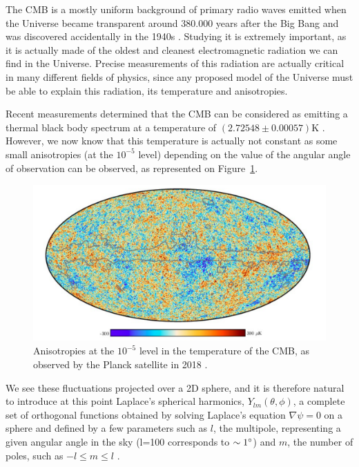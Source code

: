 \documentclass[a4paper, 10pt, openright]{report}
\begin{document}
The \ac{CMB} is a mostly uniform background of primary radio waves emitted when the Universe became transparent around 380.000 years after the Big Bang and was discovered accidentally in the 1940s \cite{CMBDiscovery}. Studying it is extremely important, as it is actually made of the oldest and cleanest electromagnetic radiation we can find in the Universe. Precise measurements of this radiation are actually critical in many different fields of physics, since any proposed model of the Universe must be able to explain this radiation, its temperature and anisotropies. 

Recent measurements determined that the \ac{CMB} can be considered as emitting a thermal black body spectrum at a temperature of $(2.72548\pm 0.00057)$K \cite{CMBTemperature}. However, we now know that this temperature is actually not constant as some small anisotropies (at the $10^{-5}$ level) depending on the value of the angular angle of observation can be observed, as represented on Figure~\ref{figure:PlanckTemperature}.

\begin{figure}[htbp]
\begin{center}
\includegraphics[width=14cm, height=6cm]{figs/PlanckTemperature.png}
\caption{Anisotropies at the $10^{-5}$ level in the temperature of the \ac{CMB}, as observed by the Planck satellite in 2018 \cite{PlanckTemperature}.}
\label{figure:PlanckTemperature}
\end{center}
\end{figure}


We see these fluctuations projected over a 2D sphere, and it is therefore natural to introduce at this point Laplace's spherical harmonics, $Y_{lm} (\theta, \phi)$, a complete set of orthogonal functions obtained by solving Laplace's equation $\nabla \psi = 0$ on a sphere and defined by a few parameters such as $l$, the multipole, representing a given angular angle in the sky (l=100 corresponds to $\sim 1\degree$) and $m$, the number of poles, such as $-l \leq m \leq l$ \cite{PowerSpectrum}. 
\end{document}
